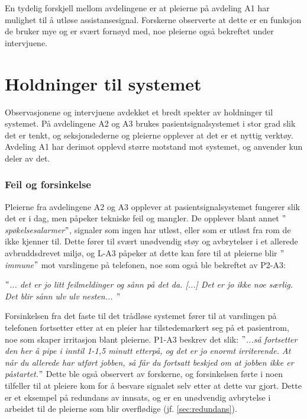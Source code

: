 \noindent
En tydelig forskjell mellom avdelingene er at pleierne på avdeling A1 har mulighet til å utløse assistansesignal. Forskerne observerte at dette er en funksjon de bruker mye og er svært fornøyd med, noe pleierne også bekreftet under intervjuene. 



\section{Holdninger til systemet}
Observasjonene og intervjuene avdekket et bredt spekter av holdninger til systemet. På avdelingene A2 og A3 brukes pasientsignalsystemet i stor grad slik det er tenkt, og seksjonslederne og pleierne opplever at det er et nyttig verktøy. Avdeling A1 har derimot opplevd større motstand mot systemet, og anvender kun deler av det.

\subsubsection{Feil og forsinkelse}
Pleierne fra avdelingene A2 og A3 opplever at pasientsignalsystemet fungerer slik det er i dag, men påpeker tekniske feil og mangler. De opplever blant annet \textit{$"$spøkelsesalarmer$"$}, signaler som ingen har utløst, eller som er utløst fra rom de ikke kjenner til. Dette fører til svært unødvendig støy og avbrytelser i et allerede avbruddsdrevet miljø, og L-A3 påpeker at dette kan føre til at pleierne blir \textit{$"$immune$"$} mot varslingene på telefonen, noe som også ble bekreftet av P2-A3:

\noindent
\textit{$"$... det er jo litt feilmeldinger og sånn på det da. [...] Det er jo ikke noe særlig. Det blir sånn ulv ulv nesten... $"$}

\noindent 
Forsinkelsen fra det faste til det trådløse systemet fører til at varslingen på telefonen fortsetter etter at en pleier har tilstedemarkert seg på et pasientrom, noe som skaper irritasjon blant pleierne. P1-A3 beskrev det slik: \textit{$"$...så fortsetter den her å pipe i inntil 1-1,5 minutt etterpå, og det er jo enormt irriterende. At når du allerede har utført jobben, så får du fortsatt beskjed om at jobben ikke er påstartet.$"$} Dette ble også observert av forskerne, og forsinkelsen førte i noen tilfeller til at pleiere kom for å besvare signalet selv etter at dette var gjort. Dette er et eksempel på redundans av innsats, og er en unødvendig avbrytelse i arbeidet til de pleierne som blir overflødige (jf. \ref {sec:redundans}).


